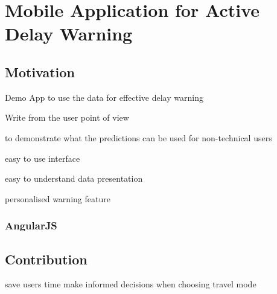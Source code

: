 \chapter{Mobile Application for Active Delay Warning}
\section{Motivation}
\par Demo App to use the data for effective delay warning

\par Write from the user point of view

\par to demonstrate what the predictions can be used for non-technical users

\par easy to use interface
\par easy to understand data presentation

\par personalised warning feature


\subsection{AngularJS}

\section{Contribution}
save users time
make informed decisions when choosing travel mode
